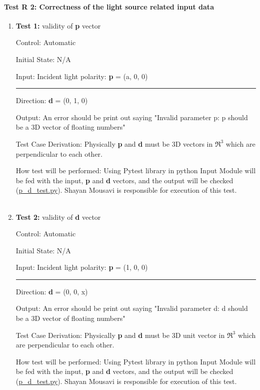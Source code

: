 \documentclass[12pt, titlepage]{article}
\begin{document}
\paragraph{Test R 2: Correctness of the light source related input data}
\begin{enumerate}		

\item{\textbf{Test 1:} validity of \textbf{p} vector\\}

Control: Automatic
					
Initial State: N/A
					
Input: Incident light polarity: \textbf{p} = (a, 0, 0)\\
\rule{1.15cm}{0pt} Direction: \textbf{d} = (0, 1, 0)
					
Output: An error should be print out saying "Invalid parameter p: p should be a 3D vector of floating numbers"  

Test Case Derivation: Physically \textbf{p} and \textbf{d} must be 3D vectors in $\Re^3$ which are perpendicular to each other.
 				
How test will be performed: Using Pytest library in python Input Module will be fed with the input, \textbf{p} and \textbf{d} vectors, and the output will be checked (\href{https://github.com/shmouses/SPDFM/tree/master/src}{p\_d\_test.py}). Shayan Mousavi is responsible for execution of this test. 
\\
\\
%
\item{\textbf{Test 2:} validity of \textbf{d} vector \\}

Control: Automatic

Initial State: N/A

Input: Incident light polarity: \textbf{p} = (1, 0, 0)\\
\rule{1.15cm}{0pt} Direction: \textbf{d} = (0, 0, x)

Output: An error should be print out saying "Invalid parameter d: d should be a 3D vector of floating numbers"  

Test Case Derivation: Physically \textbf{p} and \textbf{d} must be 3D unit vector in $\Re^3$ which are perpendicular to each other.

How test will be performed: Using Pytest library in python Input Module will be fed with the input, \textbf{p} and \textbf{d} vectors, and the output will be checked (\href{https://github.com/shmouses/SPDFM/tree/master/src}{p\_d\_test.py}). Shayan Mousavi is responsible for execution of this test. 
\\
\\


\end{enumerate}
\end{document}
